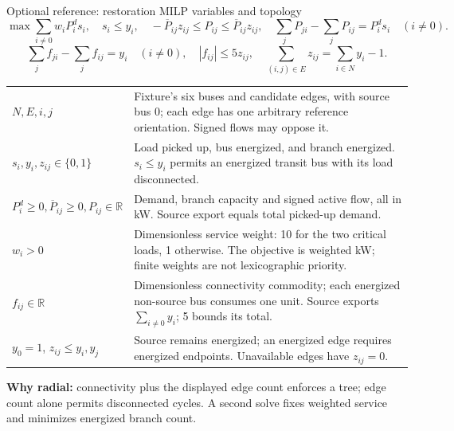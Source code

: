 \begin{frame}[t]{Optional reference: restoration MILP variables and topology}
\[
\max\sum_{i\ne0}w_iP_i^d s_i,\quad s_i\leq y_i,\quad
-\overline P_{ij}z_{ij}\leq P_{ij}\leq\overline P_{ij}z_{ij},\quad
\sum_jP_{ji}-\sum_jP_{ij}=P_i^d s_i\quad(i\ne0).
\]
\[
\sum_j f_{ji}-\sum_j f_{ij}=y_i\quad(i\ne0),\quad |f_{ij}|\leq5z_{ij},\quad
\sum_{(i,j)\in E}z_{ij}=\sum_{i\in N}y_i-1.
\]
\renewcommand{\arraystretch}{.98}
\begin{tabular}{@{}>{\raggedright\arraybackslash}p{.25\linewidth}>{\raggedright\arraybackslash}p{.68\linewidth}@{}}
$N,E,i,j$ & Fixture's six buses and candidate edges, with source bus $0$; each edge has one arbitrary reference orientation. Signed flows may oppose it. \\
$s_i,y_i,z_{ij}\in\{0,1\}$ & Load picked up, bus energized, and branch energized. $s_i\leq y_i$ permits an energized transit bus with its load disconnected. \\
$P_i^d\geq0,\overline P_{ij}\geq0,P_{ij}\in\mathbb R$ & Demand, branch capacity and signed active flow, all in kW. Source export equals total picked-up demand. \\
$w_i>0$ & Dimensionless service weight: 10 for the two critical loads, 1 otherwise. The objective is weighted kW; finite weights are not lexicographic priority. \\
$f_{ij}\in\mathbb R$ & Dimensionless connectivity commodity; each energized non-source bus consumes one unit. Source exports $\sum_{i\ne0}y_i$; 5 bounds its total. \\
$y_0=1$, $z_{ij}\leq y_i,y_j$ & Source remains energized; an energized edge requires energized endpoints. Unavailable edges have $z_{ij}=0$. \\
\end{tabular}
\par\textbf{Why radial:} connectivity plus the displayed edge count enforces a tree; edge count alone permits disconnected cycles. A second solve fixes weighted service and minimizes energized branch count.
\end{frame}

